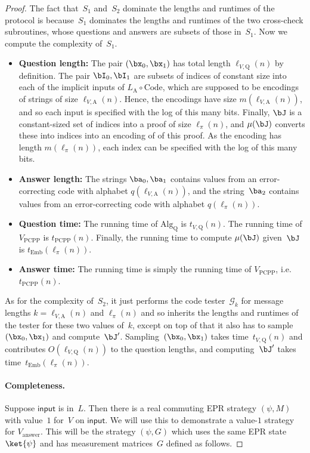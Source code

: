\documentclass[11pt]{article}
\newcommand{\codec}{\mathrm{Code}}
\newcommand{\game}{\mathscr{G}}
\begin{document}
\begin{proof}
The fact  that~$S_1$ and~$S_2$ dominate the lengths and runtimes of the protocol
is because~$S_1$ dominates the lengths and runtimes of the two cross-check subroutines,
whose questions and answers are subsets of those in~$S_1$.
Now we compute the complexity of~$S_1$.
\begin{itemize}
\item[$\circ$] \textbf{Question length:} The pair $(\bx_0, \bx_1)$ has total length $\ell_{V,\mathrm{Q}}(n)$ by definition.
		The pair $\bI_0, \bI_1$ are subsets of indices of constant size into each of the implicit inputs of $L_{\mathrm{A}} \circ \codec$,
		which are supposed to be encodings of strings of size $\ell_{V, \mathrm{A}}(n)$.
		Hence, the encodings have size $m(\ell_{V, \mathrm{A}}(n))$, and so each input is specified with the log of this many bits.
		Finally, $\bJ$ is a constant-sized set of indices into a proof of size $\ell_{\pi}(n)$, and $\mu(\bJ)$ converts these into indices into an encoding of of this proof.
		As the encoding has length $m(\ell_{\pi}(n))$, each index can be specified with the log of this many bits.
\item[$\circ$] \textbf{Answer length:} The strings $\ba_0, \ba_1$ contains values from an error-correcting code with alphabet $q(\ell_{V, \mathrm{A}}(n))$,
		and the string~$\ba_2$ contains values from an error-correcting code with alphabet $q(\ell_{\pi}(n))$.
\item[$\circ$] \textbf{Question time:} The running time of $\mathrm{Alg}_{\mathrm{Q}}$ is $t_{V,\mathrm{Q}}(n)$.
		The running time of $V_{\mathrm{PCPP}}$ is $t_{\mathrm{PCPP}}(n)$.
		Finally, the running time to compute $\mu(\bJ)$ given~$\bJ$ is $t_{\mathrm{Emb}}(\ell_{\pi}(n))$.
\item[$\circ$] \textbf{Answer time:} The running time is simply the running time of $V_{\mathrm{PCPP}}$, i.e.\ $t_{\mathrm{PCPP}}(n)$.
\end{itemize}
As for the complexity of~$S_2$, it just performs the code tester~$\game_k$ for message lengths $k = \ell_{V, \mathrm{A}}(n)$ and $\ell_\pi(n)$ and so inherits the lengths and runtimes of the tester for these two values of~$k$, except on top of that it also has to sample~$(\bx_0, \bx_1)$ and compute~$\bJ'$.
Sampling~$(\bx_0, \bx_1)$ takes time~$t_{V,\mathrm{Q}}(n)$ and contributes $O(\ell_{V, \mathrm{Q}}(n))$ to the question lengths,
and computing~$\bJ'$ takes time~$t_{\mathrm{Emb}}(\ell_{\pi}(n))$.

\paragraph{Completeness.}
Suppose $\mathsf{input}$ is in~$L$.
Then there is a real commuting EPR strategy $(\psi, M)$ with value~$1$ for~$V$ on $\mathsf{input}$.
We will use this to demonstrate a value-$1$ strategy for $V_{\mathrm{answer}}$.
This will be the strategy $(\psi, G)$ which uses the same EPR state $\ket{\psi}$ and has measurement matrices~$G$ defined as follows.


\end{proof}
\end{document}
